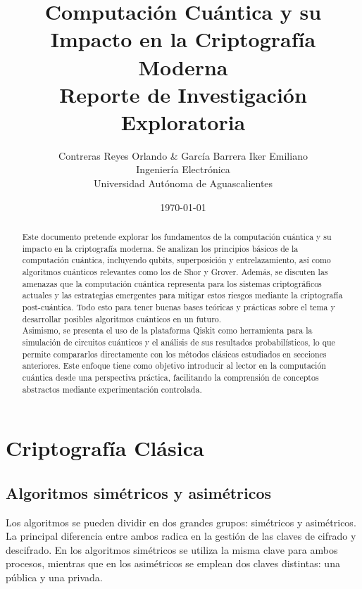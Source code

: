 \documentclass[12pt]{article}
\title{%
Computación Cuántica y su Impacto en la Criptografía Moderna\\
\large Reporte de Investigación Exploratoria
}
\author{%
Contreras Reyes Orlando & García Barrera Iker Emiliano\\
Ingeniería Electrónica\\
Universidad Autónoma de Aguascalientes
}
\date{\today}
\begin{document}
\maketitle
\thispagestyle{empty}

\begin{abstract}
Este documento pretende explorar los fundamentos de la computación cuántica y su impacto en la criptografía moderna. Se analizan los principios básicos de la computación cuántica, incluyendo qubits, superposición y entrelazamiento, así como algoritmos cuánticos relevantes como los de Shor y Grover. Además, se discuten las amenazas que la computación cuántica representa para los sistemas criptográficos actuales y las estrategias emergentes para mitigar estos riesgos mediante la criptografía post-cuántica. Todo esto para tener buenas bases teóricas y prácticas sobre el tema y desarrollar posibles algoritmos cuánticos en un futuro. \\

Asimismo, se presenta el uso de la plataforma Qiskit como herramienta para la simulación de circuitos cuánticos y el análisis de sus resultados probabilísticos, lo que permite compararlos directamente con los métodos clásicos estudiados en secciones anteriores. Este enfoque tiene como objetivo introducir al lector en la computación cuántica desde una perspectiva práctica, facilitando la comprensión de conceptos abstractos mediante experimentación controlada.

\end{abstract}

\newpage
\tableofcontents
\newpage

\section{Criptografía Clásica}
\subsection{Algoritmos simétricos y asimétricos}
Los algoritmos se pueden dividir en dos grandes grupos: simétricos y asimétricos. La principal diferencia entre ambos radica en la gestión de las claves de cifrado y descifrado. En los algoritmos simétricos se utiliza la misma clave para ambos procesos, mientras que en los asimétricos se emplean dos claves distintas: una pública y una privada. \\
\end{document}
